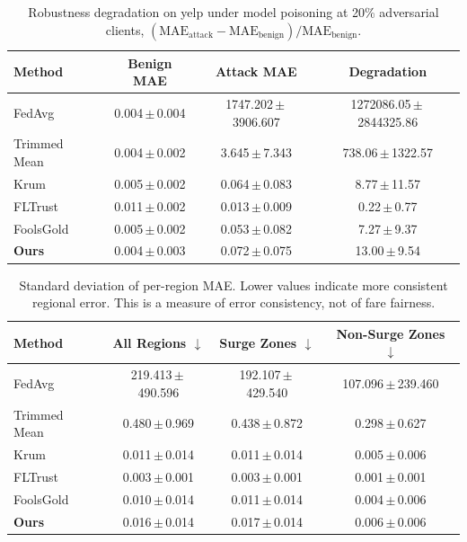 \begin{table}[t]
\centering
\scriptsize
\caption{Robustness degradation on yelp under model poisoning at 20\% adversarial clients, $(\mathrm{MAE}_{\mathrm{attack}}-\mathrm{MAE}_{\mathrm{benign}})/\mathrm{MAE}_{\mathrm{benign}}$.}
\label{tab:degradation}
\begin{tabular}{lccc}
\toprule
\textbf{Method} & \textbf{Benign MAE} & \textbf{Attack MAE} & \textbf{Degradation} \\
\midrule
FedAvg & 0.004\,$\pm$\,0.004 & 1747.202\,$\pm$\,3906.607 & 1272086.05\,$\pm$\,2844325.86 \\
Trimmed Mean & 0.004\,$\pm$\,0.002 & 3.645\,$\pm$\,7.343 & 738.06\,$\pm$\,1322.57 \\
Krum & 0.005\,$\pm$\,0.002 & 0.064\,$\pm$\,0.083 & 8.77\,$\pm$\,11.57 \\
FLTrust & 0.011\,$\pm$\,0.002 & 0.013\,$\pm$\,0.009 & 0.22\,$\pm$\,0.77 \\
FoolsGold & 0.005\,$\pm$\,0.002 & 0.053\,$\pm$\,0.082 & 7.27\,$\pm$\,9.37 \\
\textbf{Ours} & 0.004\,$\pm$\,0.003 & 0.072\,$\pm$\,0.075 & 13.00\,$\pm$\,9.54 \\
\bottomrule
\end{tabular}
\end{table}

\begin{table}[t]
\centering
\scriptsize
\caption{Standard deviation of per-region MAE. Lower values indicate more consistent regional error. This is a measure of error consistency, not of fare fairness.}
\label{tab:fairness}
\renewcommand{\arraystretch}{1.1}
\begin{tabular}{lccc}
\toprule
\textbf{Method} & \textbf{All Regions $\downarrow$} & \textbf{Surge Zones $\downarrow$} & \textbf{Non-Surge Zones $\downarrow$} \\
\midrule
FedAvg & 219.413\,$\pm$\,490.596 & 192.107\,$\pm$\,429.540 & 107.096\,$\pm$\,239.460 \\
Trimmed Mean & 0.480\,$\pm$\,0.969 & 0.438\,$\pm$\,0.872 & 0.298\,$\pm$\,0.627 \\
Krum & 0.011\,$\pm$\,0.014 & 0.011\,$\pm$\,0.014 & 0.005\,$\pm$\,0.006 \\
FLTrust & 0.003\,$\pm$\,0.001 & 0.003\,$\pm$\,0.001 & 0.001\,$\pm$\,0.001 \\
FoolsGold & 0.010\,$\pm$\,0.014 & 0.011\,$\pm$\,0.014 & 0.004\,$\pm$\,0.006 \\
\textbf{Ours} & 0.016\,$\pm$\,0.014 & 0.017\,$\pm$\,0.014 & 0.006\,$\pm$\,0.006 \\
\bottomrule
\end{tabular}
\end{table}

